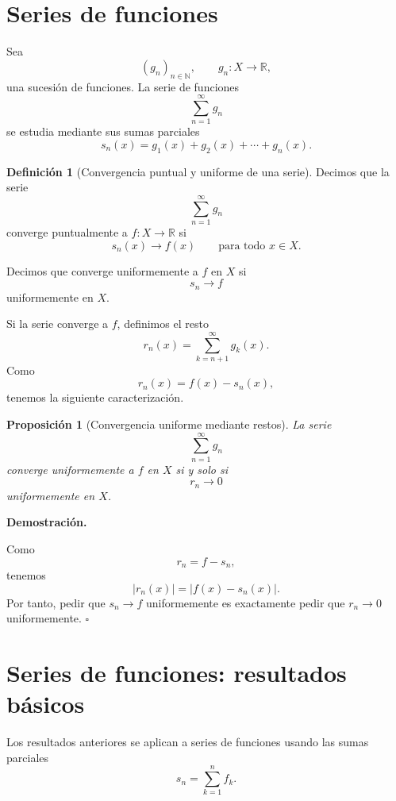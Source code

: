 \documentclass[11pt,a4paper,openany]{book}
\theoremstyle{definition}
\newtheorem{definicion}{Definición}[chapter]
\theoremstyle{plain}
\newtheorem{proposicion}{Proposición}[chapter]
\theoremstyle{remark}
\renewenvironment{proof}[1][\textbf{Demostración.}]{%
  \par\noindent #1\ \normalfont
}{\hfill$\square$\par\medskip}
\newcommand{\R}{\mathbb{R}}
\newcommand{\N}{\mathbb{N}}
\begin{document}
\section{Series de funciones}

Sea
\[
    (g_n)_{n\in\N},\qquad g_n:X\to\R,
\]
una sucesión de funciones. La serie de funciones
\[
    \sum_{n=1}^{\infty} g_n
\]
se estudia mediante sus sumas parciales
\[
    s_n(x)=g_1(x)+g_2(x)+\cdots+g_n(x).
\]

\begin{grisplano}
\begin{definicion}[Convergencia puntual y uniforme de una serie]
Decimos que la serie
\[
    \sum_{n=1}^{\infty}g_n
\]
converge puntualmente a $f:X\to\R$ si
\[
    s_n(x)\to f(x)
    \qquad \text{para todo }x\in X.
\]

Decimos que converge uniformemente a $f$ en $X$ si
\[
    s_n\to f
\]
uniformemente en $X$.
\end{definicion}
\end{grisplano}

Si la serie converge a $f$, definimos el resto
\[
    r_n(x)
    =
    \sum_{k=n+1}^{\infty}g_k(x).
\]
Como
\[
    r_n(x)=f(x)-s_n(x),
\]
tenemos la siguiente caracterización.

\begin{grisplano}
\begin{proposicion}[Convergencia uniforme mediante restos]
La serie
\[
    \sum_{n=1}^{\infty}g_n
\]
converge uniformemente a $f$ en $X$ si y solo si
\[
    r_n\to 0
\]
uniformemente en $X$.
\end{proposicion}
\end{grisplano}

\begin{proof}
Como
\[
    r_n=f-s_n,
\]
tenemos
\[
    |r_n(x)|=|f(x)-s_n(x)|.
\]
Por tanto, pedir que $s_n\to f$ uniformemente es exactamente pedir que
$r_n\to 0$ uniformemente.
\end{proof}

\section{Series de funciones: resultados básicos}

Los resultados anteriores se aplican a series de funciones usando las sumas
parciales
\[
    s_n=\sum_{k=1}^n f_k.
\]
\end{document}
